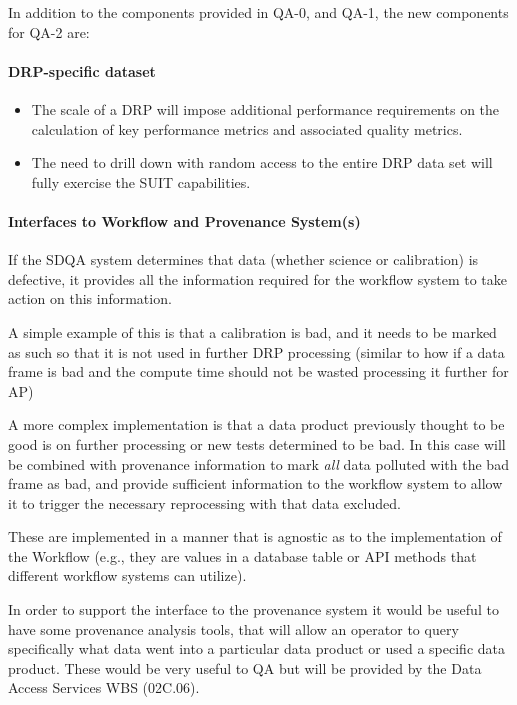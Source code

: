 In addition to the components provided in QA-0, and QA-1, the new components for QA-2 are:

\paragraph{DRP-specific dataset}
\label{sec:qaDrpDataset}
\begin{itemize}
\item The scale of a DRP will impose additional performance requirements on the calculation of key performance metrics and associated quality metrics.
\item The need to drill down with random access to the entire DRP data set will fully exercise the SUIT capabilities.
\end{itemize}


\paragraph{Interfaces to Workflow and Provenance System(s)}
\label{sec:qaOutputInterfaceWorkflowSystem}

If the SDQA system determines that data (whether science or calibration) is defective, it provides all the information required for the workflow system to take action on this information.

A simple example of this is that a calibration is bad, and it needs to be marked as such so that it is not used in further DRP processing (similar to how if a data frame is bad and the compute time should not be wasted processing it further for AP)

A more complex implementation is that a data product previously thought to be good is on further processing or new tests determined to be bad. In this case will be combined with provenance information to mark \emph{all} data polluted with the bad frame as bad, and provide sufficient information to the workflow system to allow it to trigger the necessary reprocessing with that data excluded.

These are implemented in a manner that is agnostic as to the implementation of the Workflow (e.g., they are values in a database table or API methods that different workflow systems can utilize).

In order to support the interface to the provenance system it would be useful to have some provenance analysis tools, that will allow an operator to query specifically what data went into a particular data product or used a specific data product. These would be very useful to QA but will be provided by the Data Access Services WBS (02C.06).

